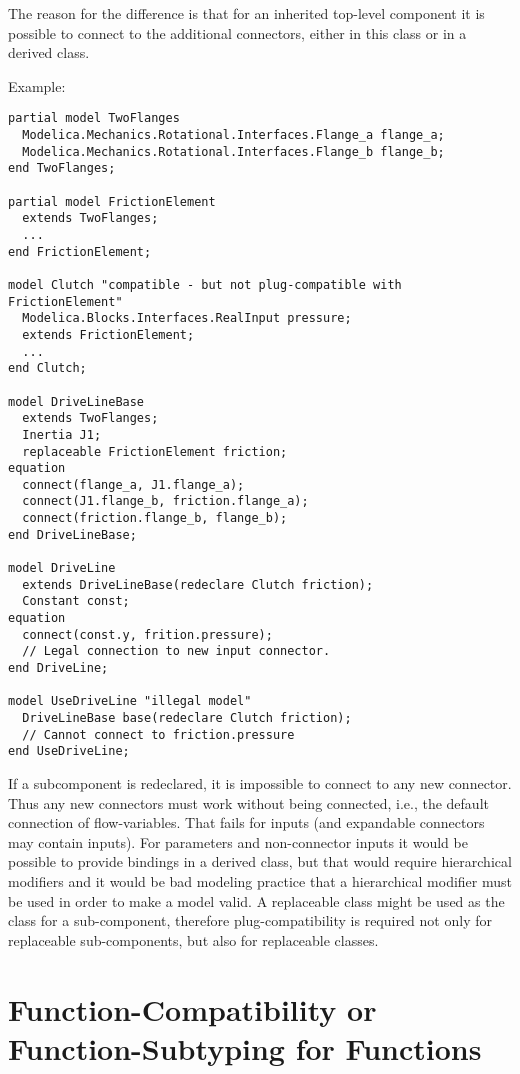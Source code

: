 \begin{nonnormative}
The reason for the difference is that for an inherited
top-level component it is possible to connect to the additional
connectors, either in this class or in a derived class.

Example:
\begin{lstlisting}[language=modelica]
partial model TwoFlanges
  Modelica.Mechanics.Rotational.Interfaces.Flange_a flange_a;
  Modelica.Mechanics.Rotational.Interfaces.Flange_b flange_b;
end TwoFlanges;

partial model FrictionElement
  extends TwoFlanges;
  ...
end FrictionElement;

model Clutch "compatible - but not plug-compatible with FrictionElement"
  Modelica.Blocks.Interfaces.RealInput pressure;
  extends FrictionElement;
  ...
end Clutch;

model DriveLineBase
  extends TwoFlanges;
  Inertia J1;
  replaceable FrictionElement friction;
equation
  connect(flange_a, J1.flange_a);
  connect(J1.flange_b, friction.flange_a);
  connect(friction.flange_b, flange_b);
end DriveLineBase;

model DriveLine
  extends DriveLineBase(redeclare Clutch friction);
  Constant const;
equation
  connect(const.y, frition.pressure);
  // Legal connection to new input connector.
end DriveLine;

model UseDriveLine "illegal model"
  DriveLineBase base(redeclare Clutch friction);
  // Cannot connect to friction.pressure
end UseDriveLine;
\end{lstlisting}

If a subcomponent is redeclared, it is impossible to connect to
any new connector. Thus any new connectors must work without being
connected, i.e., the default connection of flow-variables. That fails
for inputs (and expandable connectors may contain inputs). For
parameters and non-connector inputs it would be possible to provide
bindings in a derived class, but that would require hierarchical
modifiers and it would be bad modeling practice that a hierarchical
modifier must be used in order to make a model valid. A replaceable
class might be used as the class for a sub-component, therefore
plug-compatibility is required not only for replaceable sub-components,
but also for replaceable classes.
\end{nonnormative}

\section{Function-Compatibility or Function-Subtyping for Functions}

